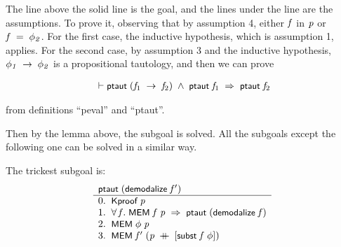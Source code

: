\documentclass{report}
\renewcommand{\HOLConst}[1]{{\textsf{\upshape\small #1}}}
\renewcommand{\HOLinline}[1]{\ensuremath{#1}}
\newenvironment{holmath}{\begin{displaymath}\begin{array}{l}}{\end{array}\end{displaymath}\ignorespacesafterend}
\begin{document}
The line above the solid line is the goal, and the lines under the line are the assumptions. To prove it, observing that by assumption 4, either \HOLinline{\HOLFreeVar{f}} in \HOLinline{\HOLFreeVar{p}} or \HOLinline{\HOLFreeVar{f}\;\HOLSymConst{=}\;\HOLFreeVar{\ensuremath{\phi\sb{2}}}}. For the first case, the inductive hypothesis, which is assumption 1, applies. For the second case, by assumption 3 and the inductive hypothesis, \HOLinline{\HOLFreeVar{\ensuremath{\phi\sb{1}}}\;\HOLSymConst{\ensuremath{\rightarrow}}\;\HOLFreeVar{\ensuremath{\phi\sb{2}}}} is a propositional tautology, and then we can prove

\begin{holmath}
  \ensuremath{\HOLTokenTurnstile}\HOLConst{ptaut}\;(\HOLFreeVar{f\sb{\mathrm{1}}}\;\HOLSymConst{\ensuremath{\rightarrow}}\;\HOLFreeVar{f\sb{\mathrm{2}}})\;\HOLSymConst{\HOLTokenConj{}}\;\HOLConst{ptaut}\;\HOLFreeVar{f\sb{\mathrm{1}}}\;\HOLSymConst{\HOLTokenImp{}}\;\HOLConst{ptaut}\;\HOLFreeVar{f\sb{\mathrm{2}}}
\end{holmath}
  
from definitions ``peval'' and ``ptaut''.

Then by the lemma above, the subgoal is solved. All the subgoals except the following one can be solved in a similar way.

The trickest subgoal is:
\[
\begin{array}{l}
\HOLinline{\HOLConst{ptaut}\;(\HOLConst{demodalize}\;\HOLFreeVar{f\sp{\prime}})}\\ \hline
0. \;\;\HOLinline{\HOLConst{Kproof}\;\HOLFreeVar{p}}\\
1. \;\;\HOLinline{\HOLSymConst{\HOLTokenForall{}}\HOLBoundVar{f}.\;\HOLConst{MEM}\;\HOLBoundVar{f}\;\HOLFreeVar{p}\;\HOLSymConst{\HOLTokenImp{}}\;\HOLConst{ptaut}\;(\HOLConst{demodalize}\;\HOLBoundVar{f})}\\
2. \;\;\HOLinline{\HOLConst{MEM}\;\HOLFreeVar{\ensuremath{\phi}}\;\HOLFreeVar{p}}\\
3. \;\;\HOLinline{\HOLConst{MEM}\;\HOLFreeVar{f\sp{\prime}}\;(\HOLFreeVar{p}\;\HOLSymConst{\HOLTokenDoublePlus}\;[\HOLConst{subst}\;\HOLFreeVar{f}\;\HOLFreeVar{\ensuremath{\phi}}])}
\end{array}
\]
\end{document}
